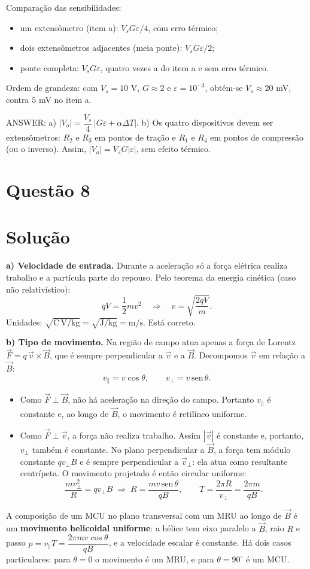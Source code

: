 \documentclass{article}%
\begin{document}
Comparação das sensibilidades:
\begin{itemize}
\item um extensômetro (item a): $V_sG\varepsilon/4$, com erro térmico;
\item dois extensômetros adjacentes (meia ponte): $V_sG\varepsilon/2$;
\item ponte completa: $V_sG\varepsilon$, quatro vezes a do item a e sem erro térmico.
\end{itemize}
Ordem de grandeza: com $V_s=10$ V, $G\approx2$ e $\varepsilon=10^{-3}$, obtém-se $V_o\approx 20$ mV, contra $5$ mV no item a.

\medskip
ANSWER: a) $|V_o|=\dfrac{V_s}{4}\,|G\varepsilon+\alpha\Delta T|$. b) Os quatro dispositivos devem ser extensômetros: $R_2$ e $R_3$ em pontos de tração e $R_1$ e $R_4$ em pontos de compressão (ou o inverso). Assim, $|V_o|=V_sG|\varepsilon|$, sem efeito térmico.%
\newpage%
\section*{Questão 8}

\section*{Solução}

\textbf{a) Velocidade de entrada.} Durante a aceleração só a força elétrica realiza trabalho e a partícula parte do repouso. Pelo teorema da energia cinética (caso não relativístico):
\[
qV=\frac{1}{2}mv^{2}\quad\Longrightarrow\quad v=\sqrt{\frac{2qV}{m}} .
\]
Unidades: $\sqrt{\mathrm{C\,V/kg}}=\sqrt{\mathrm{J/kg}}=\mathrm{m/s}$. Está correto.

\textbf{b) Tipo de movimento.} Na região de campo atua apenas a força de Lorentz $\vec F=q\,\vec v\times\vec B$, que é sempre perpendicular a $\vec v$ e a $\vec B$. Decompomos $\vec v$ em relação a $\vec B$:
\[
v_{\parallel}=v\cos\theta ,\qquad v_{\perp}=v\,\mathrm{sen}\,\theta .
\]
\begin{itemize}
\item Como $\vec F\perp\vec B$, não há aceleração na direção do campo. Portanto $v_{\parallel}$ é constante e, ao longo de $\vec B$, o movimento é retilíneo uniforme.
\item Como $\vec F\perp\vec v$, a força não realiza trabalho. Assim $|\vec v|$ é constante e, portanto, $v_\perp$ também é constante. No plano perpendicular a $\vec B$, a força tem módulo constante $qv_\perp B$ e é sempre perpendicular a $\vec v_\perp$: ela atua como resultante centrípeta. O movimento projetado é então circular uniforme:
\[
\frac{mv_\perp^{2}}{R}=qv_\perp B\;\Rightarrow\; R=\frac{mv\,\mathrm{sen}\,\theta}{qB},\qquad
T=\frac{2\pi R}{v_\perp}=\frac{2\pi m}{qB}.
\]
\end{itemize}
A composição de um MCU no plano transversal com um MRU ao longo de $\vec B$ é um \textbf{movimento helicoidal uniforme}: a hélice tem eixo paralelo a $\vec B$, raio $R$ e passo $p=v_{\parallel}T=\dfrac{2\pi m v\cos\theta}{qB}$, e a velocidade escalar é constante. Há dois casos particulares: para $\theta=0$ o movimento é um MRU, e para $\theta=90^\circ$ é um MCU.
\end{document}
